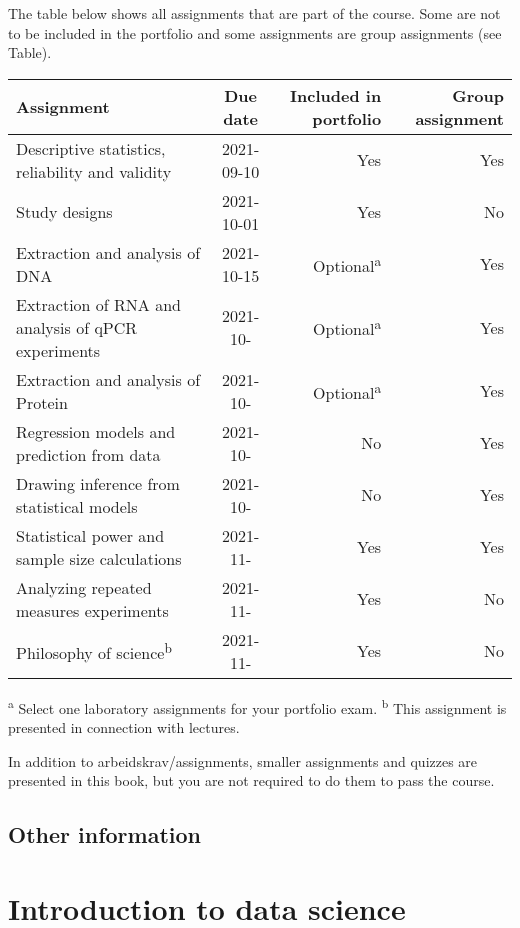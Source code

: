 \documentclass[
]{article}
\begin{document}
The table below shows all assignments that are part of the course. Some are not to be included in the portfolio and some assignments are group assignments (see Table).

\begin{longtable}[]{@{}lcrr@{}}
\toprule
Assignment & Due date & Included in portfolio & Group assignment \\
\midrule
\endhead
Descriptive statistics, reliability and validity & 2021-09-10 & Yes & Yes \\
Study designs & 2021-10-01 & Yes & No \\
Extraction and analysis of DNA & 2021-10-15 & Optional\textsuperscript{a} & Yes \\
Extraction of RNA and analysis of qPCR experiments & 2021-10- & Optional\textsuperscript{a} & Yes \\
Extraction and analysis of Protein & 2021-10- & Optional\textsuperscript{a} & Yes \\
Regression models and prediction from data & 2021-10- & No & Yes \\
Drawing inference from statistical models & 2021-10- & No & Yes \\
Statistical power and sample size calculations & 2021-11- & Yes & Yes \\
Analyzing repeated measures experiments & 2021-11- & Yes & No \\
Philosophy of science\textsuperscript{b} & 2021-11- & Yes & No \\
\bottomrule
\end{longtable}

\textsuperscript{a} Select one laboratory assignments for your portfolio exam. \textsuperscript{b} This assignment is presented in connection with lectures.

In addition to arbeidskrav/assignments, smaller assignments and quizzes are presented in this book, but you are not required to do them to pass the course.

\hypertarget{other-information}{%
\subsection{Other information}\label{other-information}}

\hypertarget{introduction-to-data-science}{%
\section{Introduction to data science}\label{introduction-to-data-science}}
\end{document}
